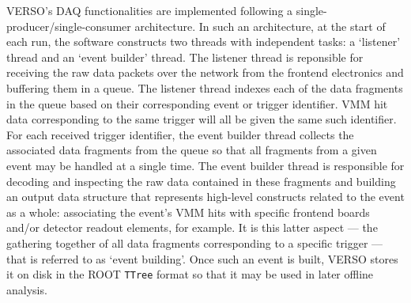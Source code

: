 VERSO's DAQ functionalities are implemented following a single-producer/single-consumer
architecture.
In such an architecture, at the start of each run, the software constructs two threads with independent
tasks: a `listener' thread and an `event builder' thread.
The listener thread is reponsible for receiving the raw data packets over the network from the
frontend electronics and buffering them in a queue.
The listener thread indexes each of the data fragments in the queue based on their corresponding
event or trigger identifier.
VMM hit data corresponding to the same trigger will all be given the
same such identifier.
For each received trigger identifier, the event builder thread collects the associated data fragments from
the queue so that all fragments from a given event may be handled at a single time.
The event builder thread is responsible for decoding and inspecting the raw data contained in these fragments and building
an output data structure that represents high-level constructs related to the event as a whole: associating
the event's VMM hits with specific frontend boards and/or detector readout elements, for example.
It is this latter aspect --- the gathering together of all data fragments corresponding to a specific trigger ---
that is referred to as `event building'.
Once such an event is built, VERSO stores it on disk in the ROOT \texttt{TTree} format
so that it may be used in later offline analysis.

